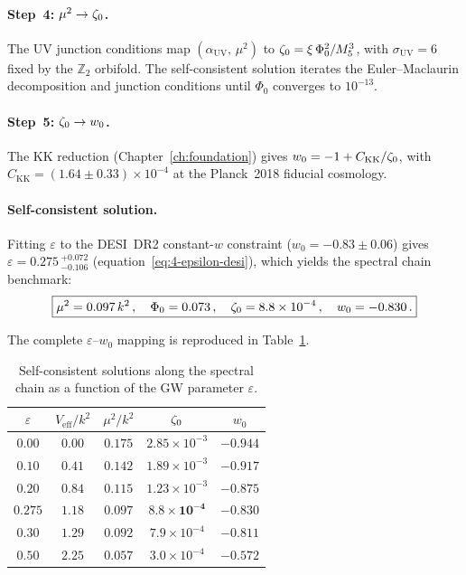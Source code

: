 \paragraph{Step~4: $\mu^2 \to \zeta_0$.}
The UV junction conditions map $(\alpha_\mathrm{UV},\, \mu^2)$ to $\zeta_0 = \xi\,\Phi_0^2/M_5^3$, with $\sigma_\mathrm{UV} = 6$ fixed by the $\mathbb{Z}_2$ orbifold.  The self-consistent solution iterates the Euler--Maclaurin decomposition and junction conditions until $\Phi_0$ converges to $10^{-13}$.

\paragraph{Step~5: $\zeta_0 \to w_0$.}
The KK reduction (Chapter~\ref{ch:foundation}) gives $w_0 = -1 + C_\mathrm{KK}/\zeta_0$, with $C_\mathrm{KK} = (1.64 \pm 0.33) \times 10^{-4}$ at the Planck~2018 fiducial cosmology.

\paragraph{Self-consistent solution.}
Fitting $\varepsilon$ to the DESI~DR2 constant-$w$ constraint ($w_0 = -0.83 \pm 0.06$) gives $\varepsilon = 0.275\, {}^{+0.072}_{-0.106}$ (equation~\eqref{eq:4-epsilon-desi}), which yields the spectral chain benchmark:
\begin{equation}
  \boxed{
    \mu^2 = 0.097\, k^2\,,\quad
    \Phi_0 = 0.073\,,\quad
    \zeta_0 = 8.8 \times 10^{-4}\,,\quad
    w_0 = -0.830\,.
  }
  \label{eq:E-benchmark}
\end{equation}

The complete $\varepsilon$--$w_0$ mapping is reproduced in Table~\ref{tab:E-epsilon}.

\begin{table}[h!]
\caption{Self-consistent solutions along the spectral chain as a function of the GW parameter $\varepsilon$.}
\label{tab:E-epsilon}
\small
\renewcommand{\arraystretch}{1.25}
\centering
\begin{tabular}{@{}ccccc@{}}
\toprule
$\varepsilon$ & $V_\mathrm{eff}/k^2$ & $\mu^2/k^2$ & $\zeta_0$ & $w_0$ \\
\midrule
$0.00$  & $0.00$ & $0.175$ & $2.85 \times 10^{-3}$ & $-0.944$ \\
$0.10$  & $0.41$ & $0.142$ & $1.89 \times 10^{-3}$ & $-0.917$ \\
$0.20$  & $0.84$ & $0.115$ & $1.23 \times 10^{-3}$ & $-0.875$ \\
$\mathbf{0.275}$  & $\mathbf{1.18}$ & $\mathbf{0.097}$ & $\mathbf{8.8 \times 10^{-4}}$ & $\mathbf{-0.830}$ \\
$0.30$  & $1.29$ & $0.092$ & $7.9 \times 10^{-4}$ & $-0.811$ \\
$0.50$  & $2.25$ & $0.057$ & $3.0 \times 10^{-4}$ & $-0.572$ \\
\bottomrule
\end{tabular}
\end{table}

